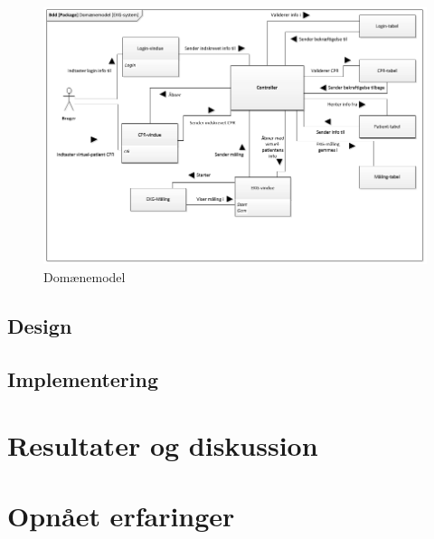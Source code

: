 \begin{figure}[H]
	\centering
	\includegraphics[width=1\textwidth]{Figurer/Snip20150429_37}
	\caption{Domænemodel}
\end{figure}


\subsection{Design}

\subsection{Implementering}

\section{Resultater og diskussion}

\section{Opnået erfaringer}

